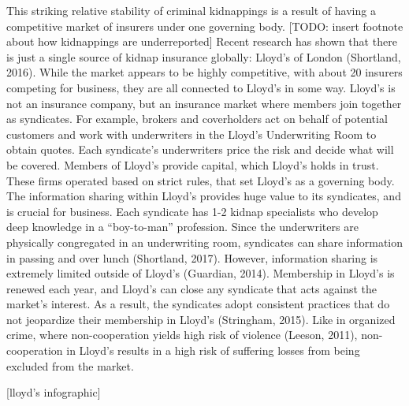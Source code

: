 \documentclass[12pt]{article}
\theoremstyle{plain}
\begin{document}
This striking relative stability of criminal kidnappings is a result of having a competitive market of insurers under one governing body. [TODO: insert footnote about how kidnappings are underreported] Recent research has shown that there is just a single source of kidnap insurance globally: Lloyd's of London (Shortland, 2016). While the market appears to be highly competitive, with about 20 insurers competing for business, they are all connected to Lloyd's in some way. Lloyd's is not an insurance company, but an insurance market where members join together as syndicates. For example, brokers and coverholders act on behalf of potential customers and work with underwriters in the Lloyd's Underwriting Room to obtain quotes. Each syndicate's underwriters price the risk and decide what will be covered. Members of Lloyd's provide capital, which Lloyd's holds in trust. These firms operated based on strict rules, that set Lloyd's as a governing body. The information sharing within Lloyd's provides huge value to its syndicates, and is crucial for business. Each syndicate has 1-2 kidnap specialists who develop deep knowledge in a ``boy-to-man'' profession. Since the underwriters are physically congregated in an underwriting room, syndicates can share information in passing and over lunch (Shortland, 2017). However, information sharing is extremely limited outside of Lloyd's (Guardian, 2014). Membership in Lloyd's is renewed each year, and Lloyd's can close any syndicate that acts against the market's interest. As a result, the syndicates adopt consistent practices that do not jeopardize their membership in Lloyd's (Stringham, 2015). Like in organized crime, where non-cooperation yields high risk of violence (Leeson, 2011), non-cooperation in Lloyd's results in a high risk of suffering losses from being excluded from the market.

[lloyd's infographic]
\end{document}
